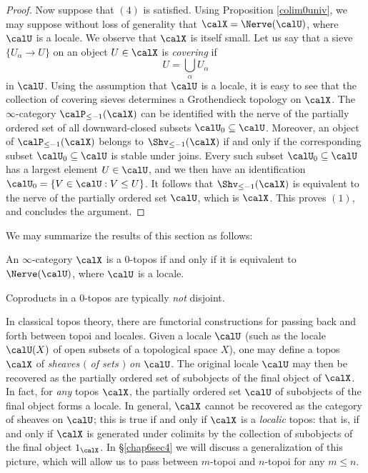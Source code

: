 \begin{proof}
Now suppose that $(4)$ is satisfied. Using Proposition \ref{colim0univ}, we may suppose without loss of generality that $\calX = \Nerve(\calU)$, where $\calU$ is a locale. We observe that
$\calX$ is itself small. Let us say that
a sieve $\{ U_{\alpha} \rightarrow U \}$ on an object $U \in \calX$ is {\it covering} if 
$$ U = \bigcup_{\alpha} U_{\alpha} $$ in $\calU$. Using the assumption that $\calU$ is a locale, it is easy to see that the collection of covering sieves determines a Grothendieck topology on
$\calX$. The $\infty$-category $\calP_{\leq -1}(\calX)$ can be identified with the nerve of
the partially ordered set of all downward-closed subsets $\calU_0 \subseteq \calU$. Moreover, an object of $\calP_{\leq -1}(\calX)$ belongs to $\Shv_{\leq -1}(\calX)$ if and only if the corresponding subset $\calU_0 \subseteq \calU$ is stable under joins. Every such subset $\calU_0 \subseteq \calU$ has a largest element $U \in \calU$, and we then have an identification
$\calU_0 = \{ V \in \calU: V \leq U\}$. It follows that $\Shv_{\leq -1}(\calX)$ is equivalent
to the nerve of the partially ordered set $\calU$, which is $\calX$. This proves $(1)$, and concludes the argument.
\end{proof}

We may summarize the results of this section as follows:

\begin{corollary}\label{charlocale}
An $\infty$-category $\calX$ is a $0$-topos if and only if it is equivalent to
$\Nerve(\calU)$, where $\calU$ is a locale.
\end{corollary}

\begin{remark}
Coproducts in a $0$-topos are typically {\em not} disjoint.
\end{remark}

In classical topos theory, there are functorial constructions for passing back and forth between topoi and locales. Given a locale $\calU$ (such as the locale $\calU(X)$ of open subsets of a topological space $X$), one 
may define a topos $\calX$ of {\it sheaves $($ of sets $)$ on $\calU$}. The original locale $\calU$ may then be recovered as the partially ordered set of subobjects of the final object of $\calX$. In fact, for {\em any} topos $\calX$, the partially ordered set $\calU$ of subobjects of the final object forms a locale. In general, $\calX$ cannot be recovered as the category of sheaves on $\calU$; this is true if and only if
$\calX$ is a {\it localic} topos: that is, if and only if $\calX$ is generated under colimits
by the collection of subobjects of the final object ${1}_{\calX}$. In \S \ref{chap6sec4} we will discuss a generalization of this picture, which will allow us to pass between $m$-topoi and $n$-topoi for any $m \leq n$.

